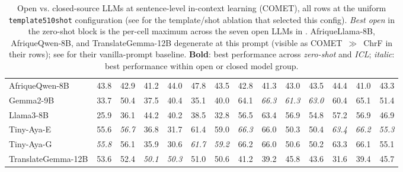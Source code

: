 \begin{table}[t]
\begin{tabular}{lrrrrrrrrrrrrr}
AfriqueQwen-8B & 43.8 & 42.9 & 41.2 & 44.0 & 47.8 & 43.5 & 42.8 & 41.3 & 43.0 & 43.5 & 44.4 & 41.0 & 43.3 \\
Gemma2-9B & 33.7 & 50.4 & 37.5 & 40.4 & 35.1 & 40.0 & 64.1 & \emph{66.3} & \emph{61.3} & \emph{63.0} & 60.4 & 65.1 & 51.4 \\
Llama3-8B & 25.9 & 36.1 & 44.2 & 40.2 & 38.5 & 32.8 & 56.5 & 63.4 & 56.9 & 54.8 & 57.2 & 56.9 & 46.9 \\
Tiny-Aya-E & 55.6 & \emph{56.7} & 36.8 & 31.7 & 61.4 & 59.0 & \emph{66.3} & 66.0 & 50.3 & 50.4 & \emph{63.4} & \emph{66.2} & \emph{55.3} \\
Tiny-Aya-G & \emph{55.8} & 56.1 & 35.9 & 30.6 & \emph{61.7} & \emph{59.2} & 66.2 & 66.0 & 50.6 & 50.2 & 63.3 & 66.1 & 55.1 \\
TranslateGemma-12B & 53.6 & 52.4 & \emph{50.1} & \emph{50.3} & 51.0 & 50.6 & 41.2 & 39.2 & 45.8 & 43.6 & 31.6 & 39.4 & 45.7 \\
\bottomrule
\end{tabular}
\caption{Open vs. closed-source LLMs at sentence-level in-context learning (COMET), all rows at the uniform \texttt{template5\textunderscore{}10shot} configuration (see  for the template/shot ablation that selected this config). \textit{Best open} in the zero-shot block is the per-cell maximum across the seven open LLMs in . AfriqueLlama-8B, AfriqueQwen-8B, and TranslateGemma-12B degenerate at this prompt (visible as COMET~$\gg$~ChrF in their rows); see  for their vanilla-prompt baseline. \textbf{Bold}: best performance across \textit{zero-shot} and \textit{ICL}; \emph{italic}: best performance within open or closed model group.}
\label{tab:open_vs_closed_icl_comet}
\end{table}

